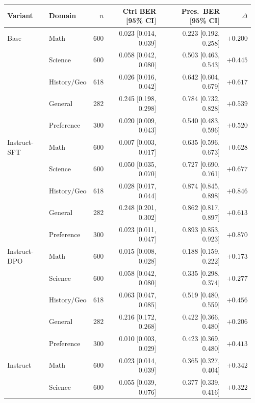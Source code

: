\documentclass{article}
\begin{document}
\begin{table}[H]
    \centering
    \scriptsize
    \setlength{\tabcolsep}{3pt}
    \renewcommand{\arraystretch}{1.0}
    \begin{tabular}{l l r r r r}
        \toprule
        Variant & Domain & $n$ & Ctrl BER [95\% CI] & Pres.\ BER [95\% CI] & $\Delta$ \\
        \midrule
        Base & Math & 600 & 0.023 [0.014, 0.039] & 0.223 [0.192, 0.258] & $+0.200$ \\
         & Science & 600 & 0.058 [0.042, 0.080] & 0.503 [0.463, 0.543] & $+0.445$ \\
         & History/Geo & 618 & 0.026 [0.016, 0.042] & 0.642 [0.604, 0.679] & $+0.617$ \\
         & General & 282 & 0.245 [0.198, 0.298] & 0.784 [0.732, 0.828] & $+0.539$ \\
         & Preference & 300 & 0.020 [0.009, 0.043] & 0.540 [0.483, 0.596] & $+0.520$ \\
        \midrule
        Instruct-SFT & Math & 600 & 0.007 [0.003, 0.017] & 0.635 [0.596, 0.673] & $+0.628$ \\
         & Science & 600 & 0.050 [0.035, 0.070] & 0.727 [0.690, 0.761] & $+0.677$ \\
         & History/Geo & 618 & 0.028 [0.017, 0.044] & 0.874 [0.845, 0.898] & $+0.846$ \\
         & General & 282 & 0.248 [0.201, 0.302] & 0.862 [0.817, 0.897] & $+0.613$ \\
         & Preference & 300 & 0.023 [0.011, 0.047] & 0.893 [0.853, 0.923] & $+0.870$ \\
        \midrule
        Instruct-DPO & Math & 600 & 0.015 [0.008, 0.028] & 0.188 [0.159, 0.222] & $+0.173$ \\
         & Science & 600 & 0.058 [0.042, 0.080] & 0.335 [0.298, 0.374] & $+0.277$ \\
         & History/Geo & 618 & 0.063 [0.047, 0.085] & 0.519 [0.480, 0.559] & $+0.456$ \\
         & General & 282 & 0.216 [0.172, 0.268] & 0.422 [0.366, 0.480] & $+0.206$ \\
         & Preference & 300 & 0.010 [0.003, 0.029] & 0.423 [0.369, 0.480] & $+0.413$ \\
        \midrule
        Instruct & Math & 600 & 0.023 [0.014, 0.039] & 0.365 [0.327, 0.404] & $+0.342$ \\
         & Science & 600 & 0.055 [0.039, 0.076] & 0.377 [0.339, 0.416] & $+0.322$ \\

\end{tabular}
\end{table}
\end{document}
